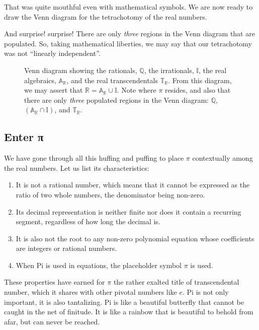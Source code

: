 \documentclass[
  a4paper,
]{article}
\begin{document}
That was quite mouthful even with mathematical symbols. We are now ready
to draw the Venn diagram for the tetrachotomy of the real numbers.

And surprise! surprise! There are only \emph{three} regions in the Venn
diagram that are populated. So, taking mathematical liberties, we may
say that our tetrachotomy was not ``linearly independent''.

\begin{figure}
\centering

\caption{Venn diagram showing the rationals, \(\mathbb{Q}\), the
irrationals, \(\mathbb{I}\), the real algebraics,
\(\mathbb{A_{\mathbb{R}}}\), and the real transcendentals
\(\mathbb{T_{\mathbb{R}}}\). From this diagram, we may assert that
\(\mathbb{R} = \mathbb{A_{\mathbb{R}}} \cup \mathbb{I}\). Note where
\(\pi\) resides, and also that there are only \emph{three} populated
regions in the Venn diagram: \(\mathbb{Q}\),
\((\mathbb{A_{\mathbb{R}}} \cap \mathbb{I})\), and
\(\mathbb{T_{\mathbb{R}}}\).}\label{fig:venn-tetra}
\end{figure}

\subsection{Enter π}\label{enter-ux3c0}

We have gone through all this huffing and puffing to place \(\pi\)
contextually among the real numbers. Let us list its characteristics:

\begin{enumerate}
\item
  It is not a rational number, which means that it cannot be expressed
  as the ratio of two whole numbers, the denominator being non-zero.
\item
  Its decimal representation is neither finite nor does it contain a
  recurring segment, regardless of how long the decimal is.
\item
  It is also not the root to any non-zero polynomial equation whose
  coefficients are integers or rational numbers.
\item
  When Pi is used in equations, the placeholder symbol \(\pi\) is used.
\end{enumerate}

These properties have earned for \(\pi\) the rather exalted title of
transcendental number, which it shares with other pivotal numbers like
\(e\). Pi is not only important, it is also tantalizing. Pi is like a
beautiful butterfly that cannot be caught in the net of finitude. It is
like a rainbow that is beautiful to behold from afar, but can never be
reached.
\end{document}
